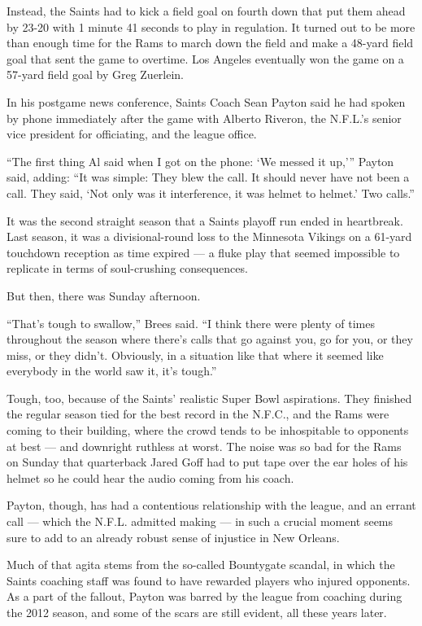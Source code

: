 Instead, the Saints had to kick a field goal on fourth down that put
them ahead by 23-20 with 1 minute 41 seconds to play in regulation. It
turned out to be more than enough time for the Rams to march down the
field and make a 48-yard field goal that sent the game to overtime. Los
Angeles eventually won the game on a 57-yard field goal by Greg
Zuerlein.

In his postgame news conference, Saints Coach Sean Payton said he had
spoken by phone immediately after the game with Alberto Riveron, the
N.F.L.'s senior vice president for officiating, and the league office.

``The first thing Al said when I got on the phone: `We messed it up,'''
Payton said, adding: ``It was simple: They blew the call. It should
never have not been a call. They said, `Not only was it interference, it
was helmet to helmet.' Two calls.''

It was the second straight season that a Saints playoff run ended in
heartbreak. Last season, it was a divisional-round loss to the Minnesota
Vikings on a 61-yard touchdown reception as time expired --- a fluke
play that seemed impossible to replicate in terms of soul-crushing
consequences.

But then, there was Sunday afternoon.

``That's tough to swallow,'' Brees said. ``I think there were plenty of
times throughout the season where there's calls that go against you, go
for you, or they miss, or they didn't. Obviously, in a situation like
that where it seemed like everybody in the world saw it, it's tough.''

Tough, too, because of the Saints' realistic Super Bowl aspirations.
They finished the regular season tied for the best record in the N.F.C.,
and the Rams were coming to their building, where the crowd tends to be
inhospitable to opponents at best --- and downright ruthless at worst.
The noise was so bad for the Rams on Sunday that quarterback Jared Goff
had to put tape over the ear holes of his helmet so he could hear the
audio coming from his coach.

Payton, though, has had a contentious relationship with the league, and
an errant call --- which the N.F.L. admitted making --- in such a
crucial moment seems sure to add to an already robust sense of injustice
in New Orleans.

Much of that agita stems from the so-called Bountygate scandal, in which
the Saints coaching staff was found to have rewarded players who injured
opponents. As a part of the fallout, Payton was barred by the league
from coaching during the 2012 season, and some of the scars are still
evident, all these years later.

